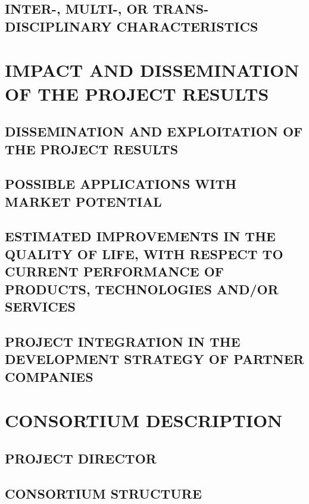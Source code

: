 \documentclass[11pt]{article}
\begin{document}
\subsection{INTER-, MULTI-, OR TRANS- DISCIPLINARY CHARACTERISTICS} 


\section{IMPACT AND DISSEMINATION OF THE PROJECT RESULTS} 

\subsection{DISSEMINATION AND EXPLOITATION OF THE PROJECT RESULTS} 


\subsection{POSSIBLE APPLICATIONS WITH MARKET POTENTIAL} 


\subsection{ESTIMATED IMPROVEMENTS IN THE QUALITY OF LIFE, WITH RESPECT TO CURRENT PERFORMANCE OF PRODUCTS, TECHNOLOGIES AND/OR SERVICES} 


\subsection{PROJECT INTEGRATION IN THE DEVELOPMENT STRATEGY OF PARTNER COMPANIES} 


\section{CONSORTIUM DESCRIPTION} 

\subsection{PROJECT DIRECTOR} 


\subsection{CONSORTIUM STRUCTURE} 

\end{document}
